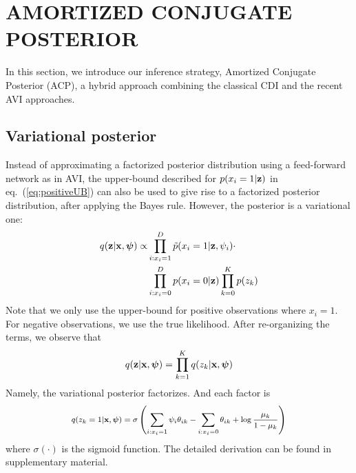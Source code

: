 \section{AMORTIZED CONJUGATE POSTERIOR}
\label{sec: method}
In this section, we introduce our inference strategy, Amortized Conjugate Posterior (ACP), a hybrid approach combining the classical CDI and the recent AVI approaches. 

\iffalse
\subsection{Variational posterior}

Instead of approximating a factorized posterior distribution using a feed-forward network as in AVI, the upper-bound described for $p(x_i=1|\mathbf{z})$ in eq.~(\ref{eq:positiveUB}) can also be used to give rise to a factorized posterior distribution, after applying the Bayes rule. However, the posterior is a variational one:
\begin{align}
    q(\mathbf{z}|\mathbf{x}, \bm{\psi})  \propto 
     &\prod_{i: x_i =1}^D\Tilde{p}(x_i=1|\mathbf{z}, \psi_i) \cdot \nonumber \\
     &\prod_{i: x_i=0}^Dp(x_i=0|\mathbf{z})\prod_{k=0}^K p(z_k)
\label{eq: lvi posterior}
\end{align}
Note that we only use the upper-bound for positive observations where $x_i=1$. For negative observations, we use the true likelihood.  After re-organizing the terms, we observe that
\begin{align}
    q(\mathbf{z}|\mathbf{x}, \bm{\psi}) = \prod_{k=1}^K q(z_k |\mathbf{x}, \bm{\psi})
\end{align}
Namely, the variational posterior factorizes. And each factor is
\begin{align}
    \medmath{q(z_k=1 |\bx, \bpsi) = 
    \sigma\left(\sum_{i:x_i=1}\psi_i\theta_{ik} - \sum_{i:x_i=0}\theta_{ik} + \log \frac{\mu_k}{1-\mu_k}\right)}
\label{eq:factorizedposterior}
\end{align}
where $\sigma(\cdot)$ is the sigmoid function. The detailed derivation can be found in supplementary material.    

